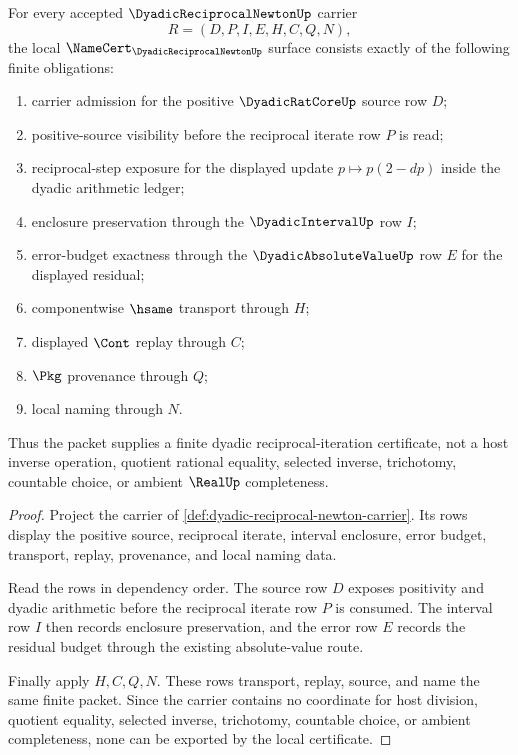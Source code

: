\begin{theorem}
\label{thm:dyadic-reciprocal-newton-namecert-obligations}
For every accepted $\DyadicReciprocalNewtonUp$ carrier
$$
R=(D,P,I,E,H,C,Q,N),
$$
the local $\NameCert_{\DyadicReciprocalNewtonUp}$ surface consists exactly of the following finite obligations:
\begin{enumerate}
\item carrier admission for the positive $\DyadicRatCoreUp$ source row $D$;
\item positive-source visibility before the reciprocal iterate row $P$ is read;
\item reciprocal-step exposure for the displayed update $p \mapsto p(2-dp)$ inside the dyadic arithmetic ledger;
\item enclosure preservation through the $\DyadicIntervalUp$ row $I$;
\item error-budget exactness through the $\DyadicAbsoluteValueUp$ row $E$ for the displayed residual;
\item componentwise $\hsame$ transport through $H$;
\item displayed $\Cont$ replay through $C$;
\item $\Pkg$ provenance through $Q$;
\item local naming through $N$.
\end{enumerate}
Thus the packet supplies a finite dyadic reciprocal-iteration certificate, not a host inverse operation, quotient rational equality, selected inverse, trichotomy, countable choice, or ambient $\RealUp$ completeness.
\end{theorem}
\begin{proof}
Project the carrier of \autoref{def:dyadic-reciprocal-newton-carrier}. Its rows display the positive source, reciprocal iterate, interval enclosure, error budget, transport, replay, provenance, and local naming data.

Read the rows in dependency order. The source row $D$ exposes positivity and dyadic arithmetic before the reciprocal iterate row $P$ is consumed. The interval row $I$ then records enclosure preservation, and the error row $E$ records the residual budget through the existing absolute-value route.

Finally apply $H,C,Q,N$. These rows transport, replay, source, and name the same finite packet. Since the carrier contains no coordinate for host division, quotient equality, selected inverse, trichotomy, countable choice, or ambient completeness, none can be exported by the local certificate.
\end{proof}

